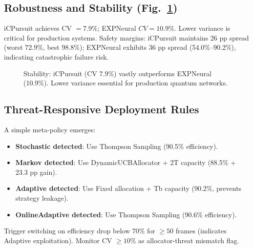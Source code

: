 \documentclass[10pt,twocolumn,journal]{IEEEtran}
\begin{document}
\subsection{Robustness and Stability (Fig.~\ref{fig:stability})}

iCPursuit achieves CV $= 7.9\%$; EXPNeural $CV = 10.9\%$. Lower variance is critical for production systems. Safety margins: iCPursuit maintains 26 pp spread (worst 72.9\%, best 98.8\%); EXPNeural exhibits 36 pp spread (54.0\%--90.2\%), indicating catastrophic failure risk.

\begin{figure}[tb]
\centering
{}
\caption{Stability: iCPursuit (CV 7.9\%) vastly outperforms EXPNeural (10.9\%). Lower variance essential for production quantum networks.}
\label{fig:stability}
\end{figure}

\subsection{Threat-Responsive Deployment Rules}

A simple meta-policy emerges:
\begin{itemize}
  \item \textbf{Stochastic detected}: Use Thompson Sampling (90.5\% efficiency).
  \item \textbf{Markov detected}: Use DynamicUCBAllocator + 2T capacity (88.5\% + 23.3 pp gain).
  \item \textbf{Adaptive detected}: Use Fixed allocation + Tb capacity (90.2\%, prevents strategy leakage).
  \item \textbf{OnlineAdaptive detected}: Use Thompson Sampling (90.6\% efficiency).
\end{itemize}

Trigger switching on efficiency drop below 70\% for $\geq 50$ frames (indicates Adaptive exploitation). Monitor CV $\geq 10\%$ as allocator-threat mismatch flag.
\end{document}
